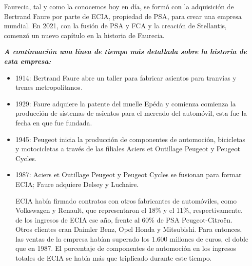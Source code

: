 \documentclass[letterpaper,12pt]{article}
\begin{document}
\begin{sloppypar}
Faurecia, tal y como la conocemos hoy en día, se formó con la adquisición de Bertrand Faure por parte de ECIA, propiedad de PSA, para crear una empresa mundial. En 2021, con la fusión de PSA y FCA y la creación de Stellantis, comenzó un nuevo capítulo en la historia de Faurecia.
\begin{center}
    \textbf{\textit{A continuación una línea de tiempo más detallada sobre la historia de esta empresa:}}
\end{center}
\begin{itemize} %
    \item 1914: Bertrand Faure abre un taller para fabricar asientos para tranvías y trenes metropolitanos.
    \item 1929: Faure adquiere la patente del muelle Epéda y comienza comienza la producción de sistemas de asientos para el mercado del automóvil, esta fue la fecha en que fue fundada. 
    \item 1945: Peugeot inicia la producción de componentes de automoción, bicicletas y motocicletas a través de las filiales Aciers et Outillage Peugeot y Peugeot Cycles.
    \item 1987:  Aciers et Outillage Peugeot y Peugeot Cycles se fusionan para formar ECIA; Faure adquiere Delsey y Luchaire.
    
    ECIA había firmado contratos con otros fabricantes de automóviles, como Volkswagen y Renault, que representaron el 18\% y el 11\%, respectivamente, de los ingresos de ECIA ese año, frente al 60\% de PSA Peugeot-Citroën. Otros clientes eran Daimler Benz, Opel Honda y Mitsubishi. Para entonces, las ventas de la empresa habían superado los 1.600 millones de euros, el doble que en 1987. El porcentaje de componentes de automoción en los ingresos totales de ECIA se había más que triplicado durante este tiempo.


\end{itemize}
\end{sloppypar}
\end{document}
